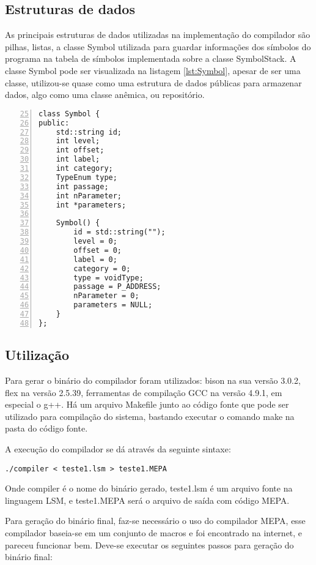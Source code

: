 \documentclass[12pt,a4paper]{article}
\begin{document}
\subsection{Estruturas de dados}

As principais estruturas de dados utilizadas na implementação do compilador são pilhas, listas, a classe Symbol utilizada para guardar informações dos símbolos do programa na tabela de símbolos implementada sobre a classe SymbolStack. A classe Symbol pode ser visualizada na listagem \ref{lst:Symbol}, apesar de ser uma classe, utilizou-se quase como uma estrutura de dados públicas para armazenar dados, algo como uma classe anêmica, ou repositório.

\lstset{language=C++, breaklines=true}
\begin{lstlisting}[caption={Representação de símbolos},frame=single,label={lst:Symbol},numbers=left,firstnumber=25]
class Symbol {
public:
    std::string id;
    int level;
    int offset;
    int label;
    int category;
    TypeEnum type;
    int passage;
    int nParameter;
    int *parameters;

    Symbol() {
        id = std::string("");
        level = 0;
        offset = 0;
        label = 0;
        category = 0;
        type = voidType;
        passage = P_ADDRESS;
        nParameter = 0;
        parameters = NULL;
    }
};
\end{lstlisting}

\subsection{Utilização}

Para gerar o binário do compilador foram utilizados: bison na sua versão 3.0.2, flex na versão 2.5.39, ferramentas de compilação GCC na versão 4.9.1, em especial o g++. Há um arquivo Makefile junto ao código fonte que pode ser utilizado para compilação do sistema, bastando executar o comando make na pasta do código fonte.

A execução do compilador se dá através da seguinte sintaxe:
\begin{verbatim}
./compiler < teste1.lsm > teste1.MEPA
\end{verbatim}
Onde compiler é o nome do binário gerado, teste1.lsm é um arquivo fonte na linguagem LSM, e teste1.MEPA será o arquivo de saída com código MEPA.

Para geração do binário final, faz-se necessário o uso do compilador MEPA, esse compilador baseia-se em um conjunto de macros e foi encontrado na internet, e pareceu funcionar bem. Deve-se executar os seguintes passos para geração do binário final:
\end{document}
